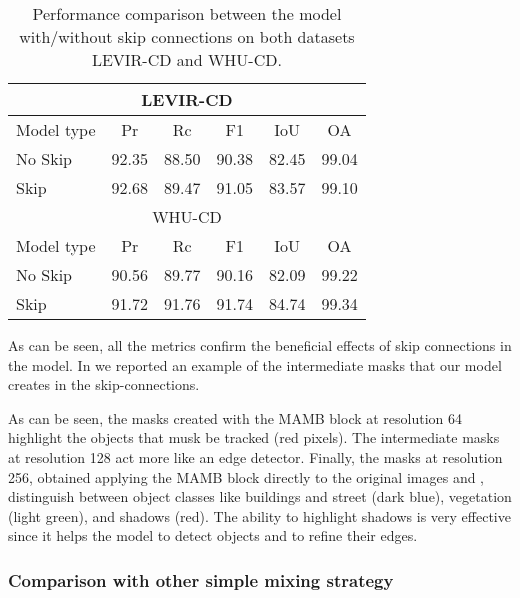 \begin{table}[ht]
    \caption{Performance comparison between the model with/without skip connections on both datasets LEVIR-CD and WHU-CD.}
    \centering
    \begin{tabular}{l|ccccc}
        \hline
        \multicolumn{6}{c}{LEVIR-CD}\\
        \hline 
        Model type & Pr & Rc & F1 & IoU & OA \\
        \hline
        No Skip & 92.35 & 88.50 & 90.38 & 82.45 & 99.04\\
        Skip & 92.68 & 89.47 & 91.05 & 83.57 & 99.10 \\
        \hline
        \multicolumn{6}{c}{WHU-CD}\\
        \hline
        Model type & Pr & Rc & F1 & IoU & OA \\
        \hline
        No Skip & 90.56 & 89.77 & 90.16 & 82.09 & 99.22\\
        Skip & 91.72 & 91.76 & 91.74 & 84.74 & 99.34 \\
        \hline
    \end{tabular}
    \label{tab:skipnoskip}
\end{table}

As can be seen, all the metrics confirm the beneficial effects of skip connections in the model.
In  we reported an example of the intermediate masks that our model creates in the skip-connections.


As can be seen, the masks created with the MAMB block at resolution 64 highlight the objects that musk be tracked (red pixels).
The intermediate masks at resolution 128 act more like an edge detector.
Finally, the masks at resolution 256, obtained applying the MAMB block directly to the original images  and , 
distinguish between object classes like buildings and street (dark blue), vegetation (light green), and shadows (red). 
The ability to highlight shadows is very effective since it helps the model to detect objects and to refine their edges.


\subsubsection{Comparison with other simple mixing strategy}

